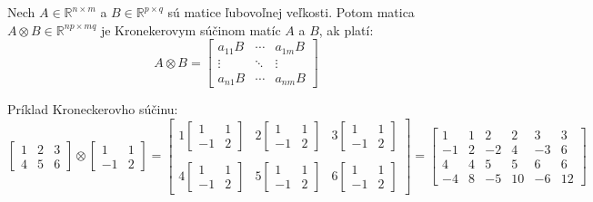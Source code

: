 \begin{toreview}
\begin{definition}
Nech $A \in \mathbb{R}^{n\times m}$ a $B \in \mathbb{R}^{p \times q}$ sú matice ľubovoľnej veľkosti.
Potom matica $A \otimes B \in \mathbb{R}^{np \times mq}$ je Kronekerovym súčinom matíc $A$ a $B$, ak platí:
$$
A \otimes B = 
\begin{bmatrix} a_{1 1} B & \cdots & a_{1 m} B \\ \vdots & \ddots & \vdots \\ a_{n 1} B & \cdots & a_{n m} B
\end{bmatrix}
$$
\end{definition}

\begin{remark}
Príklad Kroneckerovho súčinu:
$$
\begin{bmatrix}
1 & 2 & 3 \\ 4 & 5 & 6
\end{bmatrix}
\otimes
\begin{bmatrix} 1 & 1 \\ -1 & 2 \end{bmatrix}
= 
\begin{bmatrix}
1 \begin{bmatrix} 1 & 1 \\ -1 & 2 \end{bmatrix}  &  2 \begin{bmatrix} 1 & 1 \\ -1 & 2 \end{bmatrix} & 3 \begin{bmatrix} 1 & 1 \\ -1 & 2 \end{bmatrix} \\ \\
4 \begin{bmatrix} 1 & 1 \\ -1 & 2 \end{bmatrix} & 5 \begin{bmatrix} 1 & 1 \\ -1 & 2 \end{bmatrix} & 6\begin{bmatrix} 1 & 1 \\ -1 & 2 \end{bmatrix}
\end{bmatrix}
=
\begin{bmatrix}
1 & 1 & 2 & 2 & 3 & 3\\
-1 & 2 & -2 & 4 & -3 & 6\\
4 & 4 & 5 & 5 & 6 & 6\\
-4 & 8 & -5 & 10 & -6 & 12
\end{bmatrix}
$$
\end{remark}


\end{toreview}
